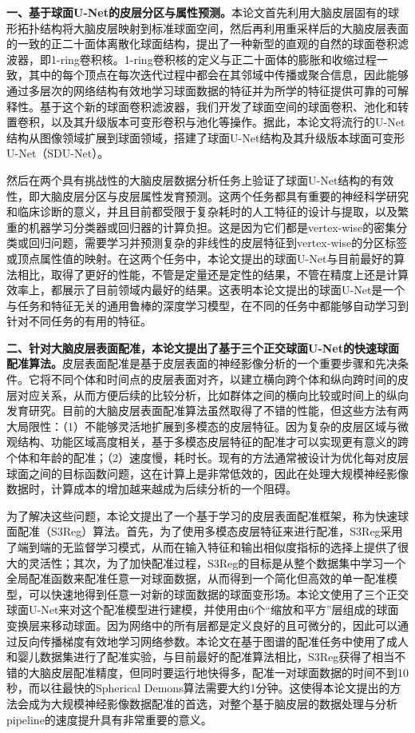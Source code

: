 \textbf{一、基于球面U-Net的皮层分区与属性预测。}本论文首先利用大脑皮层固有的球形拓扑结构将大脑皮层映射到标准球面空间，然后再利用重采样后的大脑皮层表面的一致的正二十面体离散化球面结构，提出了一种新型的直观的自然的球面卷积滤波器，即1-ring卷积核。1-ring卷积核的定义与正二十面体的膨胀和收缩过程一致，其中的每个顶点在每次迭代过程中都会在其邻域中传播或聚合信息，因此能够通过多层次的网络结构有效地学习球面数据的特征并为所学的特征提供可靠的可解释性。基于这个新的球面卷积滤波器，我们开发了球面空间的球面卷积、池化和转置卷积，以及其升级版本可变形卷积与池化等操作。据此，本论文将流行的U-Net结构\cite{ronneberger2015u}从图像领域扩展到球面领域，搭建了球面U-Net结构及其升级版本球面可变形U-Net（SDU-Net）。

然后在两个具有挑战性的大脑皮层数据分析任务上验证了球面U-Net结构的有效性，即大脑皮层分区与皮层属性发育预测。这两个任务都具有重要的神经科学研究和临床诊断的意义，并且目前都受限于复杂耗时的人工特征的设计与提取，以及繁重的机器学习分类器或回归器的计算负担。这是因为它们都是vertex-wise的密集分类或回归问题，需要学习并预测复杂的非线性的皮层特征到vertex-wise的分区标签或顶点属性值的映射。在这两个任务中，本论文提出的球面U-Net与目前最好的算法相比，取得了更好的性能，不管是定量还是定性的结果，不管在精度上还是计算效率上，都展示了目前领域内最好的结果。这表明本论文提出的球面U-Net是一个与任务和特征无关的通用鲁棒的深度学习模型，在不同的任务中都能够自动学习到针对不同任务的有用的特征。

\textbf{二、针对大脑皮层表面配准，本论文提出了基于三个正交球面U-Net的快速球面配准算法。}皮层表面配准是基于皮层表面的神经影像分析的一个重要步骤和先决条件。它将不同个体和时间点的皮层表面对齐，以建立横向跨个体和纵向跨时间的皮层对应关系，从而方便后续的比较分析，比如群体之间的横向比较或时间上的纵向发育研究。目前的大脑皮层表面配准算法虽然取得了不错的性能，但这些方法有两大局限性：（1）不能够灵活地扩展到多模态的皮层特征。因为复杂的皮层区域与微观结构、功能区域高度相关，基于多模态皮层特征的配准才可以实现更有意义的跨个体和年龄的配准；（2）速度慢，耗时长。现有的方法通常被设计为优化每对皮层球面之间的目标函数问题，这在计算上是非常低效的，因此在处理大规模神经影像数据时，计算成本的增加越来越成为后续分析的一个阻碍。

为了解决这些问题，本论文提出了一个基于学习的皮层表面配准框架，称为快速球面配准（S3Reg）算法。首先，为了使用多模态皮层特征来进行配准，S3Reg采用了端到端的无监督学习模式，从而在输入特征和输出相似度指标的选择上提供了很大的灵活性；其次，为了加快配准过程，S3Reg的目标是从整个数据集中学习一个全局配准函数来配准任意一对球面数据，从而得到一个简化但高效的单一配准模型，可以快速地得到任意一对新的球面数据的球面变形场。本论文使用了三个正交球面U-Net来对这个配准模型进行建模，并使用由6个“缩放和平方”层组成的球面变换层来移动球面。因为网络中的所有层都是定义良好的且可微分的，因此可以通过反向传播梯度有效地学习网络参数。本论文在基于图谱的配准任务中使用了成人和婴儿数据集进行了配准实验，与目前最好的配准算法相比，S3Reg获得了相当不错的大脑皮层配准精度，但同时要运行地快得多，配准一对球面数据的时间不到10秒，而以往最快的Spherical Demons算法需要大约1分钟。这使得本论文提出的方法会成为大规模神经影像数据配准的首选，对整个基于脑皮层的数据处理与分析pipeline的速度提升具有非常重要的意义。

